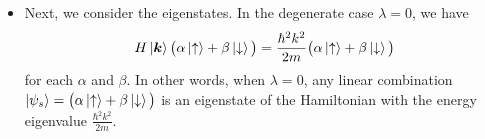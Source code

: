 \documentclass[11pt, a4paper]{article}
\renewcommand{\vec}[1]{\bm{#1}} %
\newcommand{\ua}{\uparrow}  %
\newcommand{\da}{\downarrow}  %
\renewcommand{\k}{\vec{k}}  %
\begin{document}
\begin{itemize}

	\item Next, we consider the eigenstates. In the degenerate case $ \lambda = 0 $, we have
	\begin{equation*}
		H \ket{\k} \big(\alpha \ket{\ua} + \beta \ket{\da}\big) = \frac{\hbar^{2}k^{2}}{2m}\big(\alpha \ket{\ua} + \beta \ket{\da}\big)
	\end{equation*}
	for each $ \alpha $ and $ \beta $. In other words, when $ \lambda = 0 $, any linear combination $ \ket{\psi_{s}} = \big(\alpha \ket{\ua} + \beta \ket{\da}\big) $ is an eigenstate of the Hamiltonian with the energy eigenvalue $  \frac{\hbar^{2}k^{2}}{2m} $.
	

\end{itemize}
\end{document}
